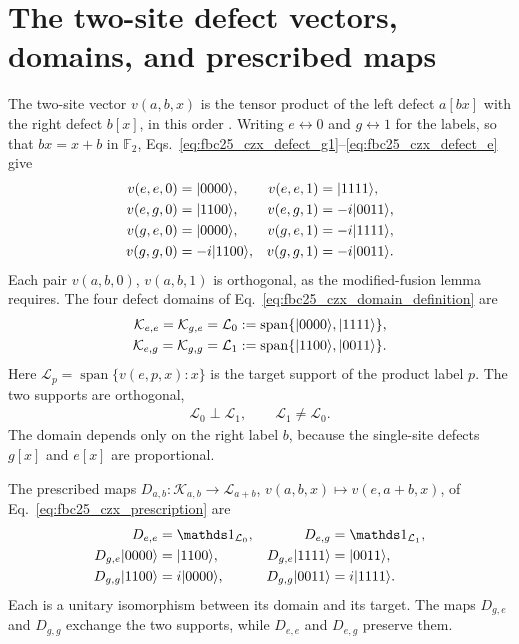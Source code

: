 \documentclass{article}
\begin{document}
\section{The two-site defect vectors, domains, and prescribed maps}

The two-site vector $v(a,b,x)$ is the tensor product of the left defect
$a[bx]$ with the right defect $b[x]$, in this order
\cite[lines~4234--4245]{FrancoRubio2025MPUGauging}. Writing $e\leftrightarrow0$
and $g\leftrightarrow1$ for the labels, so that $bx=x+b$ in $\mathbb F_2$,
Eqs.~\ref{eq:fbc25_czx_defect_g1}--\ref{eq:fbc25_czx_defect_e} give
\begin{align}
    v(e,e,0)&=|0000\rangle,
    &
    v(e,e,1)&=|1111\rangle,
    \label{eq:fbc25_czx_v_ee}\\
    v(e,g,0)&=|1100\rangle,
    &
    v(e,g,1)&=-i|0011\rangle,
    \label{eq:fbc25_czx_v_eg}\\
    v(g,e,0)&=|0000\rangle,
    &
    v(g,e,1)&=-i|1111\rangle,
    \label{eq:fbc25_czx_v_ge}\\
    v(g,g,0)&=-i|1100\rangle,
    &
    v(g,g,1)&=-i|0011\rangle.
    \label{eq:fbc25_czx_v_gg}
\end{align}
Each pair $v(a,b,0)$, $v(a,b,1)$ is orthogonal, as the modified-fusion
lemma requires. The four defect domains of
Eq.~\ref{eq:fbc25_czx_domain_definition} are
\begin{align}
    \mathcal K_{e,e}=\mathcal K_{g,e}
        &=\mathcal L_0
        :=\operatorname{span}\{|0000\rangle,|1111\rangle\},
    \label{eq:fbc25_czx_even_domains}\\
    \mathcal K_{e,g}=\mathcal K_{g,g}
        &=\mathcal L_1
        :=\operatorname{span}\{|1100\rangle,|0011\rangle\}.
    \label{eq:fbc25_czx_odd_domains}
\end{align}
Here $\mathcal L_p=\operatorname{span}\{v(e,p,x):x\}$ is the target support
of the product label $p$. The two supports are orthogonal,
\begin{align}
    \mathcal L_0\perp\mathcal L_1,
    \qquad
    \mathcal L_1\neq\mathcal L_0.
    \label{eq:fbc25_czx_targets_orthogonal}
\end{align}
The domain depends only on the right label $b$, because the single-site
defects $g[x]$ and $e[x]$ are proportional.

The prescribed maps $D_{a,b}\colon\mathcal K_{a,b}\to\mathcal L_{a+b}$,
$v(a,b,x)\mapsto v(e,a+b,x)$, of Eq.~\ref{eq:fbc25_czx_prescription} are
\begin{align}
    D_{e,e}&=\Id_{\mathcal L_0},
    &
    D_{e,g}&=\Id_{\mathcal L_1},
    \label{eq:fbc25_czx_maps_identity}\\
    D_{g,e}\ket{0000}&=\ket{1100},
    &
    D_{g,e}\ket{1111}&=\ket{0011},
    \label{eq:fbc25_czx_map_ge}\\
    D_{g,g}\ket{1100}&=i\ket{0000},
    &
    D_{g,g}\ket{0011}&=i\ket{1111}.
    \label{eq:fbc25_czx_map_gg}
\end{align}
Each is a unitary isomorphism between its domain and its target. The maps
$D_{g,e}$ and $D_{g,g}$ exchange the two supports, while $D_{e,e}$ and
$D_{e,g}$ preserve them.
\end{document}
